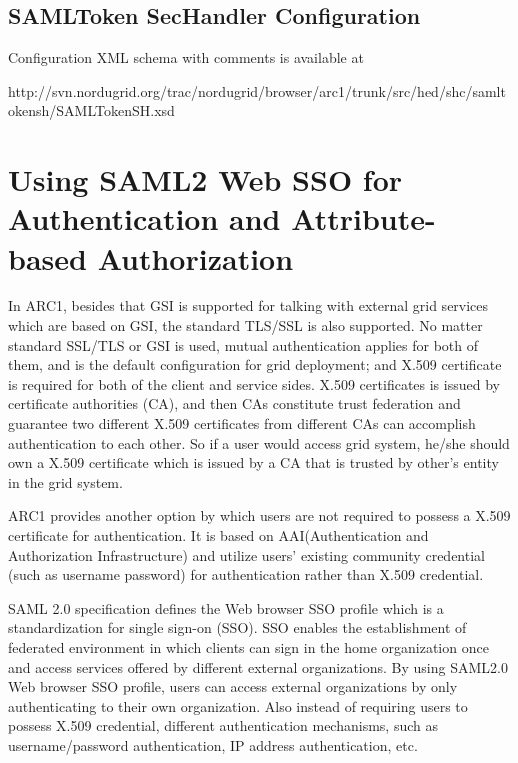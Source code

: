 \documentclass{article}                            %
\begin{document}
\subsection{SAMLToken SecHandler Configuration} %
\label{subsec:st_sechandler_conf}
Configuration XML schema with comments is available at 

http://svn.nordugrid.org/trac/nordugrid/browser/arc1/trunk/src/hed/shc/samltokensh/SAMLTokenSH.xsd



\section{Using SAML2 Web SSO for Authentication and Attribute-based Authorization} %
\label{sec:samlsso}
   In ARC1, besides that GSI is supported for talking with external grid services which are based on GSI, the standard TLS/SSL is also supported. No matter standard SSL/TLS or GSI is used, mutual authentication applies for both of them, and is the default configuration for grid deployment; and X.509 certificate is required for both of the client and service sides. X.509 certificates is issued by certificate authorities (CA), and then CAs constitute trust federation and guarantee two different X.509 certificates from different CAs can accomplish authentication to each other. So if a user would access grid system, he/she should own a X.509 certificate which is issued by a CA that is trusted by other's entity in the grid system.

   ARC1 provides another option by which users are not required to possess a X.509 certificate for authentication. It is based on AAI(Authentication and Authorization Infrastructure) and utilize users' existing community credential (such as username password) for authentication rather than X.509 credential.

   SAML 2.0 specification defines the Web browser SSO profile which is a standardization for single sign-on (SSO). SSO enables the establishment of federated environment in which clients can sign in the home organization once and access services offered by different external organizations. By using SAML2.0 Web browser SSO profile, users can access external organizations by only authenticating to their own organization. Also instead of requiring users to possess X.509 credential, different authentication mechanisms, such as username/password authentication, IP address authentication, etc.
\end{document}
